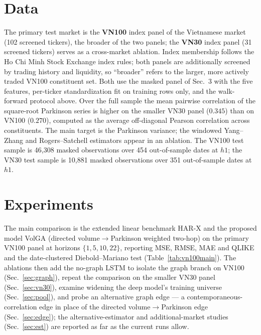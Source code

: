 \documentclass[runningheads]{llncs}
\begin{document}
\section{Data}
The primary test market is the \textbf{VN100} index panel of the Vietnamese market (102 screened
tickers), the broader of the two panels; the \textbf{VN30} index panel (31 screened
tickers) serves as a cross-market ablation. Index membership follows the Ho Chi Minh Stock Exchange
index rules; both panels are additionally screened by trading history and liquidity, so ``broader''
refers to the larger, more actively traded VN100 constituent set. Both use the masked panel of Sec.~3
with the five features, per-ticker standardization fit on training rows only, and the walk-forward
protocol above. Over the full sample the mean pairwise correlation of the square-root Parkinson series
is higher on the smaller VN30 panel ($0.345$) than on VN100 ($0.270$), computed as the average
off-diagonal Pearson correlation across constituents. The main target is the Parkinson variance; the
windowed Yang--Zhang and Rogers--Satchell estimators appear in an ablation. The VN100 test sample is
46{,}308 masked observations over 454 out-of-sample dates at $h1$; the VN30 test sample is 10{,}881
masked observations over 351 out-of-sample dates at $h1$.

\section{Experiments}
The main comparison is the extended linear benchmark HAR-X and the proposed model VolGA (directed
volume$\to$Parkinson weighted two-hop) on the primary VN100 panel at horizons $\{1,5,10,22\}$,
reporting MSE, RMSE, MAE and QLIKE and the date-clustered Diebold--Mariano test (Table~\ref{tab:vn100main}).
The ablations then add the no-graph LSTM to isolate the graph branch on VN100 (Sec.~\ref{sec:graph}),
repeat the comparison on the smaller VN30 panel (Sec.~\ref{sec:vn30}), examine widening the deep
model's training universe (Sec.~\ref{sec:pool}), and probe an alternative graph edge --- a
contemporaneous-correlation edge in place of the directed volume$\to$Parkinson edge
(Sec.~\ref{sec:edge}); the alternative-estimator and additional-market studies (Sec.~\ref{sec:est})
are reported as far as the current runs allow.
\end{document}
